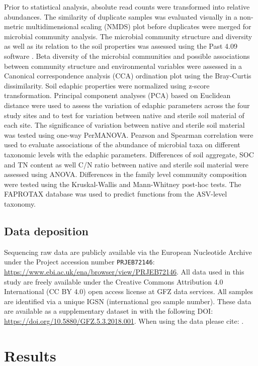 Prior to statistical analysis, absolute read counts were transformed into relative abundances. The similarity of duplicate samples was evaluated visually in a non-metric multidimensional scaling (NMDS) plot before duplicates were merged for microbial community analysis. The microbial community structure and diversity as well as its relation to the soil properties was assessed using the Past 4.09 software \citep{Hammer2001}. Beta diversity of the microbial communities and possible associations between community structure and environmental variables were assessed in a Canonical correspondence analysis (CCA) ordination plot using the Bray-Curtis dissimilarity. Soil edaphic properties were normalized using z-score transformation. Principal component analyses (PCA) based on Euclidean distance were used to assess the variation of edaphic parameters across the four study sites and to test for variation between native and sterile soil material of each site. The significance of variation between native and sterile soil material was tested using one-way PerMANOVA. Pearson and Spearman correlation were used to evaluate associations of the abundance of microbial taxa on different taxonomic levels with the edaphic parameters. Differences of soil aggregate, SOC and TN content as well C/N ratio between native and sterile soil material were assessed using ANOVA. Differences in the family level community composition were tested using the Kruskal-Wallis and Mann-Whitney post-hoc tests. 
The FAPROTAX database \citep{Louca2016} was used to predict functions from the ASV-level taxonomy.

\subsection{Data deposition}

Sequencing raw data are publicly available via the European Nucleotide Archive under the Project accession number \texttt{PRJEB72146}: \url{https://www.ebi.ac.uk/ena/browser/view/PRJEB72146}. All data used in this study are freely available under the Creative Commons Attribution 4.0 International (CC BY 4.0) open access license at GFZ data services. All samples are identified via a unique IGSN (international geo sample number). These data are available as a supplementary dataset in \citet{Bernhard2018} with the following DOI: \url{https://doi.org/10.5880/GFZ.5.3.2018.001}. When using the data please cite: \citet{Bernhard2018a}.

\section{Results}
